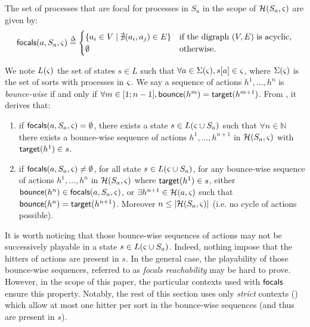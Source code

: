 \begin{definition}\label{def:focals}
The set of processes that are focal for processes in $S_a$ in the scope of $\mathcal{H}(S_a,\varsigma)$
are given by:
\[
\mathsf{focals}(a,S_a,\varsigma) \stackrel{\Delta}=
\begin{cases}
\{ a_i \in V \mid \nexists (a_i,a_j)\in E\} & \text{if the digraph $(V,E)$ is acyclic},\\
\emptyset & \text{otherwise.}\\
\end{cases}
\]
\end{definition}

We note $L(\varsigma)$ the set of states $s\in L$ such that $\forall a\in\Sigma(\varsigma), {s[a]}\in\varsigma$,
where $\Sigma(\varsigma)$ is the set of sorts with processes in $\varsigma$.
We say a sequence of actions $h^1,\dots,h^n$ is \emph{bounce-wise} if and only if
$\forall m\in[1;n-1], \mathsf{bounce}(h^m)=\mathsf{target}(h^{m+1})$.
From , it derives that:
\begin{enumerate}
\item if $\mathsf{focals}(a,S_a,\varsigma)=\emptyset$, there exists a 
state $s\in L(\varsigma\cup S_a)$ such that $\forall n\in\mathbb N$ there
exists a bounce-wise sequence of actions $h^1,\dots,h^{n+1}$ in $\mathcal{H}(S_a,\varsigma)$ 
with $\mathsf{target}(h^1)\in s$.
\item if $\mathsf{focals}(a,S_a,\varsigma)\neq\emptyset$, for all
state $s\in L(\varsigma\cup S_a)$,
for any bounce-wise sequence of actions $h^1,\dots,h^n$ in $\mathcal{H}(S_a,\varsigma)$ where $\mathsf{target}(h^1)\in
s$,
either
 $\mathsf{bounce}(h^n) \in \mathsf{focals}(a,S_a,\varsigma)$,
or
$\exists h^{n+1}\in \mathcal{H}(a,\varsigma)$ such that $\mathsf{bounce}(h^n) = \mathsf{target}(h^{n+1})$.
Moreover $n\leq|\mathcal{H}(S_a,\varsigma)|$ (i.e. no cycle of actions possible).
\end{enumerate}

It is worth noticing that those bounce-wise sequences of actions may not be successively playable in
a state $s\in L(\varsigma\cup S_a)$.
Indeed, nothing impose that the hitters of actions are present in $s$.
In the general case, the playability of those bounce-wise sequences, referred to as \emph{focals
reachability} may be hard to prove.
However, in the scope of this paper, the particular contexts used with $\mathsf{focals}$ ensure this property.
Notably, the rest of this section uses only \emph{strict} contexts () which
allow at most one hitter per sort in the bounce-wise sequences (and thus are present in $s$).

